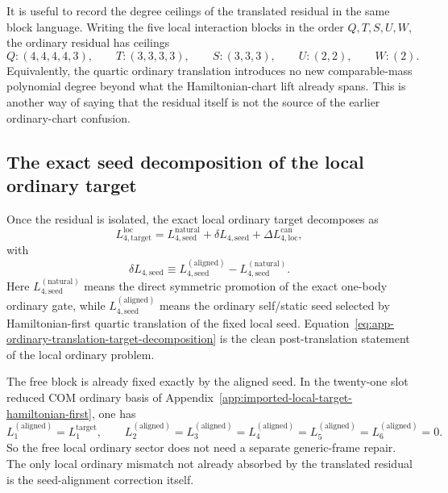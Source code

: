 \documentclass[11pt]{article}
\begin{document}
It is useful to record the degree ceilings of the translated residual in the
same block language.  Writing the five local interaction blocks in the order
$Q,T,S,U,W$, the ordinary residual has ceilings
\begin{equation}
Q:(4,4,4,4,3),
\qquad
T:(3,3,3,3),
\qquad
S:(3,3,3),
\qquad
U:(2,2),
\qquad
W:(2).
\label{eq:app-ordinary-translation-residual-degree-ceilings}
\end{equation}
Equivalently, the quartic ordinary translation introduces no new comparable-mass
polynomial degree beyond what the Hamiltonian-chart lift already spans.  This is
another way of saying that the residual itself is not the source of the earlier
ordinary-chart confusion.

\subsection{The exact seed decomposition of the local ordinary target}
\label{app:ordinary-translation-seed-decomposition}

Once the residual is isolated, the exact local ordinary target decomposes as
\begin{equation}
\boxed{
L_{4,\mathrm{target}}^{\mathrm{loc}}
=
L_{4,\mathrm{seed}}^{\mathrm{natural}}
+
\delta L_{4,\mathrm{seed}}
+
\Delta L_{4,\mathrm{loc}}^{\mathrm{can}},
}
\label{eq:app-ordinary-translation-target-decomposition}
\end{equation}
with
\begin{equation}
\delta L_{4,\mathrm{seed}}
\equiv
L_{4,\mathrm{seed}}^{(\mathrm{aligned})}
-
L_{4,\mathrm{seed}}^{(\mathrm{natural})}.
\label{eq:app-ordinary-translation-seed-alignment-definition}
\end{equation}
Here
$L_{4,\mathrm{seed}}^{(\mathrm{natural})}$ means the direct symmetric promotion
of the exact one-body ordinary gate, while
$L_{4,\mathrm{seed}}^{(\mathrm{aligned})}$ means the ordinary self/static seed
selected by Hamiltonian-first quartic translation of the fixed local seed.
Equation~\eqref{eq:app-ordinary-translation-target-decomposition} is the clean
post-translation statement of the local ordinary problem.

The free block is already fixed exactly by the aligned seed.  In the twenty-one
slot reduced COM ordinary basis of
Appendix~\ref{app:imported-local-target-hamiltonian-first}, one has
\begin{equation}
L_1^{(\mathrm{aligned})}=L_1^{\mathrm{target}},
\qquad
L_2^{(\mathrm{aligned})}=L_3^{(\mathrm{aligned})}=L_4^{(\mathrm{aligned})}=L_5^{(\mathrm{aligned})}=L_6^{(\mathrm{aligned})}=0.
\label{eq:app-ordinary-translation-aligned-free-block}
\end{equation}
So the free local ordinary sector does not need a separate generic-frame repair.
The only local ordinary mismatch not already absorbed by the translated residual
is the seed-alignment correction itself.
\end{document}
